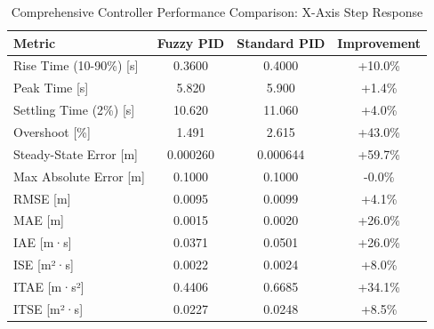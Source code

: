 \begin{table}[htbp]
\centering
\caption{Comprehensive Controller Performance Comparison: X-Axis Step Response}
\label{tab:controller_comparison_comprehensive}
\begin{tabular}{lccc}
\toprule
Metric & Fuzzy PID & Standard PID & Improvement \\
\midrule
Rise Time (10-90\%) [s] & 0.3600 & 0.4000 & \textcolor{green!50!black}{+10.0\%} \\
Peak Time [s] & 5.820 & 5.900 & \textcolor{green!50!black}{+1.4\%} \\
Settling Time (2\%) [s] & 10.620 & 11.060 & \textcolor{green!50!black}{+4.0\%} \\
Overshoot [\%] & 1.491 & 2.615 & \textcolor{green!50!black}{+43.0\%} \\
Steady-State Error [m] & 0.000260 & 0.000644 & \textcolor{green!50!black}{+59.7\%} \\
Max Absolute Error [m] & 0.1000 & 0.1000 & -0.0\% \\
RMSE [m] & 0.0095 & 0.0099 & \textcolor{green!50!black}{+4.1\%} \\
MAE [m] & 0.0015 & 0.0020 & \textcolor{green!50!black}{+26.0\%} \\
IAE [m·s] & 0.0371 & 0.0501 & \textcolor{green!50!black}{+26.0\%} \\
ISE [m²·s] & 0.0022 & 0.0024 & \textcolor{green!50!black}{+8.0\%} \\
ITAE [m·s²] & 0.4406 & 0.6685 & \textcolor{green!50!black}{+34.1\%} \\
ITSE [m²·s] & 0.0227 & 0.0248 & \textcolor{green!50!black}{+8.5\%} \\
\bottomrule
\end{tabular}
\end{table}
